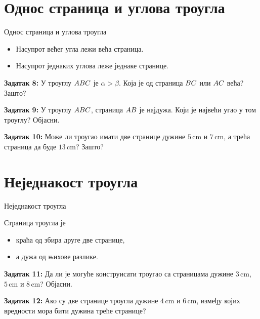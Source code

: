 \documentclass[11pt]{beamer}
\begin{document}
\section{Однос страница и углова троугла}
\begin{frame}{Однос страница и углова троугла}

\begin{itemize}
    \item Насупрот већег угла лежи већа страница.
    \item Насупрот једнаких углова леже једнаке странице.
\end{itemize}

\textbf{Задатак 8:}
У троуглу $\mathnormal{ABC}$ је $\alpha > \beta$.
Која је од страница
$\mathnormal{BC}$ или $\mathnormal{AC}$ већа? Зашто?

\textbf{Задатак 9:}
У троуглу $\mathnormal{ABC}$, страница $\mathnormal{AB}$ је најдужа.
Који је највећи угао у том троуглу? Објасни.

\textbf{Задатак 10:}
Може ли троугао имати две странице дужине
$5 \,\mathrm{cm}$ и $7 \,\mathrm{cm}$,
а трећа страница да буде $13 \,\mathrm{cm}$? Зашто?

\end{frame}


\section{Неједнакост троугла}
\begin{frame}{Неједнакост троугла}

Страница троугла је
\begin{itemize}
    \item краћа од збира друге две странице,
    \item а дужа од њихове разлике.
\end{itemize}

\textbf{Задатак 11:}
Да ли је могуће конструисати троугао са страницама дужине
$3 \,\mathrm{cm}$, $5 \,\mathrm{cm}$ и $8 \,\mathrm{cm}$? Објасни.

\textbf{Задатак 12:}
Ако су две странице троугла дужине
$4 \,\mathrm{cm}$ и $6 \,\mathrm{cm}$,
између којих вредности мора бити дужина треће странице?

\end{frame}
\end{document}
